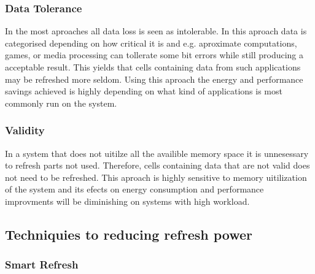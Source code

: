 \subsubsection*{\textbf{Data Tolerance}}
In the most aproaches all data loss is seen as intolerable. In this aproach data is categorised depending on how critical it is and e.g. aproximate computations, games, or media processing can tollerate some bit errors while still producing a acceptable result. This yields that cells containing data from such applications may be refreshed more seldom. Using this aproach the energy and performance savings achieved is highly depending on what kind of applications is most commonly run on the system.


\subsubsection*{\textbf{Validity}}
In a system that does not uitilze all the availible memory space it is unnesessary to refresh parts not used. Therefore, cells containing data that are not valid does not need to be refreshed. This aproach is highly sensitive to memory uitilization of the system and its efects on energy consumption and performance improvments will be diminishing on systems with high workload.  


\subsection{Techniquies to reducing refresh power}


\subsubsection*{\textbf{Smart Refresh}}
\label{par:smartrefresh}


